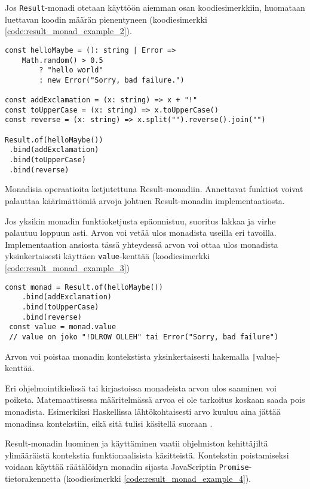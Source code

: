 Jos \texttt{Result}-monadi otetaan käyttöön aiemman osan koodiesimerkkiin, huomataan luettavan koodin määrän pienentyneen (koodiesimerkki \ref{code:result_monad_example_2}).

\begin{code}
    \begin{verbatim}
const helloMaybe = (): string | Error => 
    Math.random() > 0.5 
        ? "hello world" 
        : new Error("Sorry, bad failure.")

const addExclamation = (x: string) => x + "!"
const toUpperCase = (x: string) => x.toUpperCase()
const reverse = (x: string) => x.split("").reverse().join("")

Result.of(helloMaybe())
 .bind(addExclamation)
 .bind(toUpperCase)
 .bind(reverse)
\end{verbatim}
    \caption{Monadisia operaatioita ketjutettuna Result-monadiin. Annettavat funktiot voivat palauttaa käärimättömiä arvoja johtuen Result-monadin implementaatiosta.}
    \label{code:result_monad_example_2}
\end{code}

Jos yksikin monadin funktioketjusta epäonnistuu, suoritus lakkaa ja virhe palautuu loppuun asti. Arvon voi vetää ulos monadista useilla eri tavoilla. Implementaation ansiosta tässä yhteydessä arvon voi ottaa ulos monadista yksinkertaisesti käyttäen \texttt{value}-kenttää (koodiesimerkki \ref{code:result_monad_example_3})


\begin{code}
    \begin{verbatim}
const monad = Result.of(helloMaybe())
    .bind(addExclamation)
    .bind(toUpperCase)
    .bind(reverse)
 const value = monad.value
 // value on joko "!DLROW OLLEH" tai Error("Sorry, bad failure")
\end{verbatim}
    \caption{Arvon voi poistaa monadin kontekstista yksinkertaisesti hakemalla \texttt|value|-kenttää.}
    \label{code:result_monad_example_3}
\end{code}

Eri ohjelmointikielissä tai kirjastoissa monadeista arvon ulos saaminen voi poiketa. Matemaattisessa määritelmässä arvoa ei ole tarkoitus koskaan saada pois monadista. Esimerkiksi Haskellissa lähtökohtaisesti arvo kuuluu aina jättää monadinsa kontekstiin, eikä sitä tulisi käsitellä suoraan \cite{haskellallmonad}.

Result-monadin luominen ja käyttäminen vaatii ohjelmiston kehittäjiltä ylimääräistä kontekstia funktionaalisista käsitteistä. Kontekstin poistamiseksi voidaan käyttää räätälöidyn monadin sijasta JavaScriptin \texttt{Promise}-tietorakennetta (koodiesimerkki \ref{code:result_monad_example_4}).

